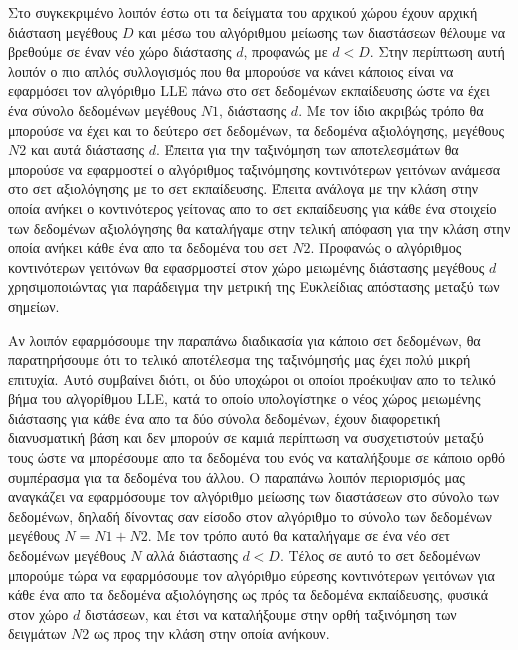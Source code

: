 \par
Στο συγκεκριμένο λοιπόν έστω οτι τα δείγματα του αρχικού χώρου έχουν αρχική διάσταση μεγέθους $D$ και μέσω του αλγόριθμου μείωσης των διαστάσεων θέλουμε να βρεθούμε σε έναν νέο χώρο διάστασης $d$, προφανώς με $d < D$. Στην περίπτωση αυτή λοιπόν ο πιο απλός συλλογισμός που θα μπορούσε να κάνει κάποιος είναι να εφαρμόσει τον αλγόριθμο \textlatin{LLE} πάνω στο σετ δεδομένων εκπαίδευσης ώστε να έχει ένα σύνολο δεδομένων μεγέθους $Ν1$, διάστασης $d$. Με τον ίδιο ακριβώς τρόπο θα μπορούσε να έχει και το δεύτερο σετ δεδομένων, τα δεδομένα αξιολόγησης, μεγέθους $N2$ και αυτά διάστασης $d$. Έπειτα για την ταξινόμηση των αποτελεσμάτων θα μπορούσε να εφαρμοστεί ο αλγόριθμος ταξινόμησης κοντινότερων γειτόνων ανάμεσα στο σετ αξιολόγησης με το σετ εκπαίδευσης. Έπειτα ανάλογα με την κλάση στην οποία ανήκει ο κοντινότερος γείτονας απο το σετ εκπαίδευσης για κάθε ένα στοιχείο των δεδομένων αξιολόγησης θα καταλήγαμε στην τελική απόφαση για την κλάση στην οποία ανήκει κάθε ένα απο τα δεδομένα του σετ $N2$. Προφανώς ο αλγόριθμος κοντινότερων γειτόνων θα εφασρμοστεί στον χώρο μειωμένης διάστασης μεγέθους $d$ χρησιμοποιώντας για παράδειγμα την μετρική της Ευκλείδιας απόστασης μεταξύ των σημείων.
\par
Αν λοιπόν εφαρμόσουμε την παραπάνω διαδικασία για κάποιο σετ δεδομένων, θα παρατηρήσουμε ότι το τελικό αποτέλεσμα της ταξινόμησής μας έχει πολύ μικρή επιτυχία. Αυτό συμβαίνει διότι, οι δύο υποχώροι οι οποίοι προέκυψαν απο το τελικό βήμα του αλγορίθμου \textlatin{LLE}, κατά το οποίο υπολογίστηκε ο νέος χώρος μειωμένης διάστασης για κάθε ένα απο τα δύο σύνολα δεδομένων, έχουν διαφορετική διανυσματική βάση και δεν μπορούν σε καμιά περίπτωση να συσχετιστούν μεταξύ τους ώστε να μπορέσουμε απο τα δεδομένα του ενός να καταλήξουμε σε κάποιο ορθό συμπέρασμα για τα δεδομένα του άλλου. Ο παραπάνω λοιπόν περιορισμός μας αναγκάζει να εφαρμόσουμε τον αλγόριθμο μείωσης των διαστάσεων στο σύνολο των δεδομένων, δηλαδή δίνοντας σαν είσοδο στον αλγόριθμο το σύνολο των δεδομένων μεγέθους $N = N1+N2$. Με τον τρόπο αυτό θα καταλήγαμε σε ένα νέο σετ δεδομένων μεγέθους $N$ αλλά διάστασης $d < D$. Τέλος σε αυτό το σετ δεδομένων μπορούμε τώρα να εφαρμόσουμε τον αλγόριθμο εύρεσης κοντινότερων γειτόνων για κάθε ένα απο τα δεδομένα αξιολόγησης ως πρός τα δεδομένα εκπαίδευσης, φυσικά στον χώρο $d$ διστάσεων, και έτσι να καταλήξουμε στην ορθή ταξινόμηση των δειγμάτων $N2$ ως προς την κλάση στην οποία ανήκουν. 

